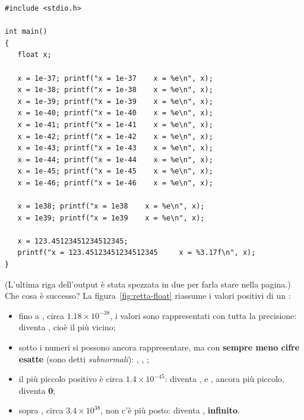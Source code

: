 \begin{affianco}[0.56][t]
\codicepiccolo
\begin{lstlisting}[style=c, name=float.c]
#include <stdio.h>

int main()
{
   float x;

   x = 1e-37; printf("x = 1e-37    x = %e\n", x);
   x = 1e-38; printf("x = 1e-38    x = %e\n", x);
   x = 1e-39; printf("x = 1e-39    x = %e\n", x);
   x = 1e-40; printf("x = 1e-40    x = %e\n", x);
   x = 1e-41; printf("x = 1e-41    x = %e\n", x);
   x = 1e-42; printf("x = 1e-42    x = %e\n", x);
   x = 1e-43; printf("x = 1e-43    x = %e\n", x);
   x = 1e-44; printf("x = 1e-44    x = %e\n", x);
   x = 1e-45; printf("x = 1e-45    x = %e\n", x);
   x = 1e-46; printf("x = 1e-46    x = %e\n", x);

   x = 1e38; printf("x = 1e38    x = %e\n", x);
   x = 1e39; printf("x = 1e39    x = %e\n", x);

   x = 123.45123451234512345;
   printf("x = 123.45123451234512345     x = %3.17f\n", x);
}
\end{lstlisting}
\risultato
\codicepiccolo
{}
\end{affianco}

(L'ultima riga dell'output è stata spezzata in due per farla stare nella
pagina.) Che cosa è successo? La figura~\ref{fig:retta-float} riassume i
valori positivi di un :

\begin{itemize}
  \item fino a , circa $1.18 ^{-38}$, i valori sono
        rappresentati con tutta la precisione:  diventa
        , cioè il  più vicino;
  \item sotto  i numeri si possono ancora rappresentare, ma
        con \textbf{sempre meno cifre esatte} (sono detti
        \textit{subnormali}): , ,
        ;
  \item il più piccolo  positivo è circa $1.4 ^{-45}$:
         diventa , e , ancora più
        piccolo, diventa \textbf{0};
  \item sopra , circa $3.4 ^{38}$, non c'è più
        posto:  diventa , \textbf{infinito}.
\end{itemize}

